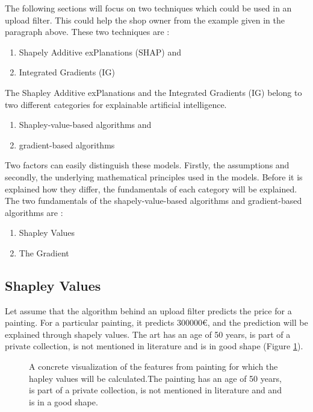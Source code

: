 The following sections will focus on two techniques which could be used in an upload filter. This could help the shop owner from the example given in the paragraph above. These two techniques are \cite{Kuang2017}:

\begin{enumerate}
	\item Shapely Additive exPlanations (SHAP) and
	\item Integrated Gradients (IG)
\end{enumerate}

The Shapley Additive exPlanations and the Integrated Gradients (IG) belong to two different categories for explainable artificial intelligence. 

\begin{enumerate}
	\item Shapley-value-based algorithms and 
	\item gradient-based algorithms 
\end{enumerate}

Two factors can easily distinguish these models. Firstly, the assumptions and secondly, the underlying mathematical principles used in the models. Before it is explained how they differ, the fundamentals of each category will be explained.\\

The two fundamentals of the shapely-value-based algorithms and gradient-based algorithms are \cite{MichaelJordan2018} \cite{Kuang2017}:

\begin{enumerate}
	\item Shapley Values
	\item The Gradient
\end{enumerate}

\subsection*{Shapley Values}

Let assume that the algorithm behind an upload filter predicts the price for a painting. For a particular painting, it predicts 300000€, and the prediction will be explained through shapely values. The art has an age of 50 years, is part of a private collection, is not mentioned in literature and is in good shape (Figure \ref{fig:shapley_values_example_01}).\\

\begin{figure}[!htp]
	\centering
	\caption{A concrete visualization of the features from painting for which the hapley values will be calculated.The painting has an age of 50 years, is part of a private collection, is not mentioned in literature and and is in a good shape.}
	\label{fig:shapley_values_example_01}
\end{figure}

